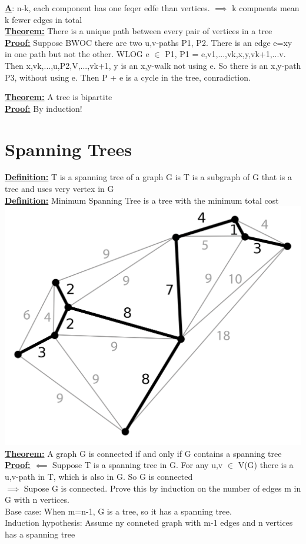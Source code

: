 \documentclass[12pt]{article}
\newcommand{\myt}[1]{\textbf{\underline{#1}}}
\begin{document}
	\myt{A}: n-k, each component has one feqer edfe than vertices. $\implies$ k compnents mean k fewer edges in total\\
	
	\myt{Theorem:} There is a unique path between every pair of vertices in a tree\\
	
	\myt{Proof:} Suppose BWOC there are two u,v-paths P1, P2. There is an edge e=xy in one path but not the other. WLOG e $\in$ P1, P1 = e,v1,...,vk,x,y,vk+1,...v. Then x,vk,...,u,P2,V,...,vk+1, y is an x,y-walk not using e. So there is an x,y-path P3, without using e. Then P + e is a cycle in the tree, conradiction.
	
	\myt{Theorem:} A tree is bipartite\\
	\myt{Proof:} By induction!\\
	
	\section*{Spanning Trees}
	\myt{Definition:} T is a spanning tree of a graph G is T is a subgraph of G that is a tree and uses very vertex in G\\
	
	\myt{Definition:} Minimum Spanning Tree is a tree with the minimum total cost\\
	\includegraphics[scale=0.1]{spanningtree.png}\\
	
	\myt{Theorem:} A graph G is connected if and only if G contains a spanning tree\\
	\myt{Proof:} $\impliedby$ Suppose T is a spanning tree in G. For any u,v $\in$ V(G) there is a u,v-path in T, which is also in G. So G is connected\\
	$\implies$ Supose G is connected. Prove this by induction on the number of edges m in G with n vertices.\\
	Base case: When m=n-1, G is a tree, so it has a spanning tree.\\
	Induction hypothesis: Assume ny conneted graph with m-1 edges and n vertices has a spanning tree\\
	
	
\end{document}
